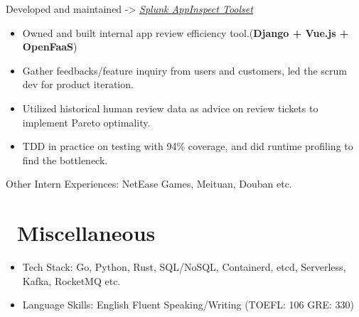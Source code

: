\documentclass{resume}
\begin{document}
Developed and maintained -> \href{https://dev.splunk.com/enterprise/docs/releaseapps/appinspect}{\underline{\textit{Splunk AppInspect Toolset}}}
\begin{itemize}%
      \item Owned and built internal app review efficiency tool.(\textbf{Django + Vue.js + OpenFaaS})
      \item Gather feedbacks/feature inquiry from users and customers, led the scrum dev for product iteration.
      \item Utilized historical human review data as advice on review tickets to implement Pareto optimality.
      \item TDD in practice on testing with 94\% coverage, and did runtime profiling to find the bottleneck.
\end{itemize}
\bigbreak
Other Intern Experiences: NetEase Games, Meituan, Douban etc.



\section{\faInfo\ Miscellaneous}
\begin{itemize}[parsep=0.5ex]
  \item Tech Stack: Go, Python, Rust, SQL/NoSQL, Containerd, etcd, Serverless, Kafka, RocketMQ etc.
  \item Language Skills: English Fluent Speaking/Writing (TOEFL: 106 GRE: 330)
\end{itemize}
\end{document}
